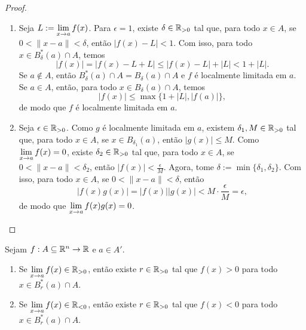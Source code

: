 \begin{proof}
    \leavevmode
        \begin{enumerate}[leftmargin=*, align=left, label=\textbf{(\alph*)}]
            \item Seja $\displaystyle L := \lim_{x \to a} f(x)$. Para $\epsilon = 1$, existe $\delta \in \mathbb{R}_{>0}$ tal que, para todo $x \in A$, se $0 < \|x-a\| < \delta$, então $|f(x) - L| < 1$. Com isso, para todo $x \in B^*_{\delta}(a) \cap A$, temos
                \[
                    |f(x)| = |f(x) - L + L| \leq |f(x)-L| + |L| < 1 + |L|.
                \]
            Se $a \notin A$, então $B^*_{\delta}(a) \cap A = B_{\delta}(a) \cap A$ e $f$ é localmente limitada em $a$. Se $a \in A$, então, para todo $x \in B_{\delta}(a) \cap A$, temos
                \[
                    |f(x)| \leq \max \{ 1+|L|, |f(a)| \},
                \]
            de modo que $f$ é localmente limitada em $a$. \blackproof
            \item Seja $\epsilon \in \mathbb{R}_{>0}$. Como $g$ é localmente limitada em $a$, existem $\delta_1, M \in \mathbb{R}_{>0}$ tal que, para todo $x \in A$, se $x \in B_{\delta_1}(a)$, então $|g(x)| \leq M$. Como $\displaystyle \lim_{x \to a} f(x) = 0$, existe $\delta_2 \in \mathbb{R}_{>0}$ tal que, para todo $x \in A$, se $0<\|x-a\|<\delta_2$, então $|f(x)| < \frac{\epsilon}{M}$. Agora, tome $\delta := \min \{\delta_1, \delta_2\}$. Com isso, para todo $x \in A$, se $0<\|x-a\|<\delta$, então
                \[
                    |f(x) g(x)| = |f(x)| |g(x)| < M \cdot \dfrac{\epsilon}{M} = \epsilon,
                \]
            de modo que $\displaystyle \lim_{x \to a} f(x) g(x) = 0$. \blackproof
        \end{enumerate}
\end{proof}

\begin{proposition}
    Sejam $f : A \subseteq \mathbb{R}^n \to \mathbb{R}$ e $a \in A'$.
        \begin{enumerate}[leftmargin=*, align=left, label=\textbf{(\alph*)}]
            \item Se $\displaystyle \lim_{x \to a} f(x) \in \mathbb{R}_{>0}$, então existe $r \in \mathbb{R}_{>0}$ tal que $f(x) > 0$ para todo $x \in B^*_{r}(a) \cap A$.
            \item Se $\displaystyle \lim_{x \to a} f(x) \in \mathbb{R}_{<0}$, então existe $r \in \mathbb{R}_{>0}$ tal que $f(x) < 0$ para todo $x \in B^*_{r}(a) \cap A$.
        \end{enumerate}
\end{proposition}

